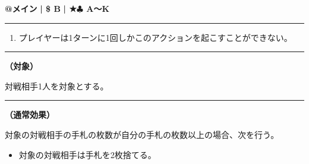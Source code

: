 \documentclass[twocolumn,a5paper,papersize,10pt]{jarticle}
\begin{document}
\begin{tcolorbox}[title={\small\bf【Action】内乱}{\scriptsize （通常魔法）}]

{\scriptsize\bf @メイン }
  {\scriptsize\bf | \$ B }
  {\scriptsize\bf | ★{\normalsize $\clubsuit$} A〜K}

\vspace{1mm} %
\hrule height 0.1mm depth 0mm width 62mm %
\vspace{1mm} %


\vspace{-1zh}%
\begin{enumerate}
\renewcommand{\labelenumi}{※}
\setlength{\leftskip}{-0.3cm}
\setlength{\itemsep}{0pt} %
\setlength{\parskip}{0pt} %

\item プレイヤーは1ターンに1回しかこのアクションを起こすことができない。

\vspace{-3mm}%
\end{enumerate}
\vspace{-2mm} %
\vspace{1zh}%
\vspace{1mm} %
\hrule height 0.1mm depth 0mm width 62mm %
\vspace{1mm} %

{\bf（対象）}

対戦相手1人を対象とする。

\vspace{1mm} %
\hrule height 0.1mm depth 0mm width 62mm %
\vspace{1mm} %

{\bf（通常効果）}

対象の対戦相手の手札の枚数が自分の手札の枚数以上の場合、次を行う。


\vspace{-1zh}%
\begin{itemize}
\setlength{\leftskip}{-0.3cm}
\setlength{\parskip}{0pt} %

\item 対象の対戦相手は手札を2枚捨てる。
\vspace{-1zh}%
\end{itemize}

\vspace{1mm} %
\end{tcolorbox}
\end{document}
